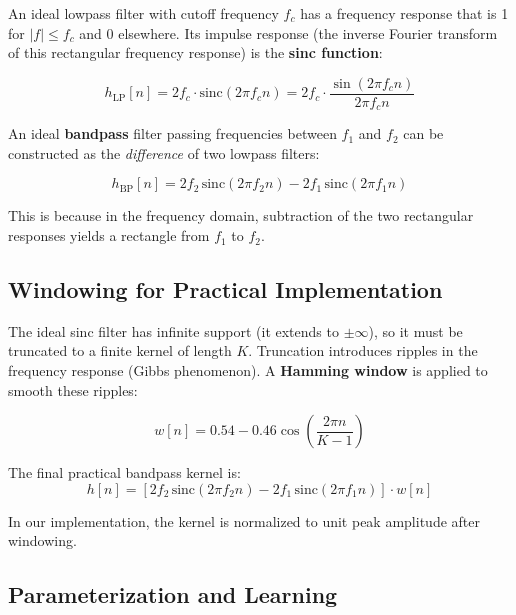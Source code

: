 \documentclass[12pt]{report}
\begin{document}
An ideal lowpass filter with cutoff frequency $f_c$ has a frequency response that is 1 for
$|f| \leq f_c$ and 0 elsewhere. Its impulse response (the inverse Fourier transform of this
rectangular frequency response) is the \textbf{sinc function}:

\begin{equation}
    h_\text{LP}[n] = 2f_c \cdot \text{sinc}(2\pi f_c n) = 2f_c \cdot \frac{\sin(2\pi f_c n)}{2\pi f_c n}
\end{equation}

An ideal \textbf{bandpass} filter passing frequencies between $f_1$ and $f_2$ can be
constructed as the \emph{difference} of two lowpass filters:

\begin{equation}
    h_\text{BP}[n] = 2f_2 \,\text{sinc}(2\pi f_2 n) - 2f_1 \,\text{sinc}(2\pi f_1 n)
    \label{eq:sincbp}
\end{equation}

This is because in the frequency domain, subtraction of the two rectangular responses yields
a rectangle from $f_1$ to $f_2$.

\subsection{Windowing for Practical Implementation}

The ideal sinc filter has infinite support (it extends to $\pm\infty$), so it must be
truncated to a finite kernel of length $K$. Truncation introduces ripples in the frequency
response (Gibbs phenomenon). A \textbf{Hamming window} is applied to smooth these ripples:

\begin{equation}
    w[n] = 0.54 - 0.46 \cos\!\left(\frac{2\pi n}{K - 1}\right)
\end{equation}

The final practical bandpass kernel is:
\begin{equation}
    h[n] = \left[2f_2 \,\text{sinc}(2\pi f_2 n) - 2f_1 \,\text{sinc}(2\pi f_1 n)\right] \cdot w[n]
\end{equation}

In our implementation, the kernel is normalized to unit peak amplitude after windowing.

\subsection{Parameterization and Learning}
\end{document}
